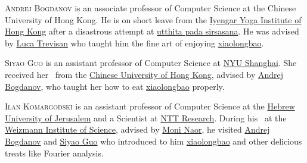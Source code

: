 \documentclass{toc}
\begin{document}
%
%
%
%
%
%
%
%
%
%
%
%
%
%
\begin{tocaboutauthors}
\begin{tocabout}[Bogdanov]  %
  \textsc{Andrej Bogdanov} is an associate professor of Computer Science at the Chinese University of Hong Kong. He is on short leave from the \href{http://www.iyengaryogahongkong.com}{Iyengar Yoga Institute of Hong Kong} after a disastrous attempt at \href{https://www.yogapedia.com/definition/8043/utthita-pada-sirsasana}{utthita pada sirsasana}.  He was advised by \href{https://lucatrevisan.wordpress.com}{Luca Trevisan} who taught him the fine art of enjoying \href{https://en.wikipedia.org/wiki/Xiaolongbao}{xiaolongbao}.
\end{tocabout}
\begin{tocabout}[Guo]
%
  \textsc{Siyao Guo} is an assistant professor of Computer Science at \href{https://shanghai.nyu.edu/}{NYU Shanghai}. She received her \phd\
from the \href{http://www.cuhk.edu.hk/english/index.html}{Chinese University of Hong Kong}, advised by 
\href{http://www.cse.cuhk.edu.hk/~andrejb/}{Andrej Bogdanov}, who taught her how to eat \href{https://en.wikipedia.org/wiki/Xiaolongbao}{xiaolongbao} properly.
\end{tocabout}
\begin{tocabout}[Komargodski]
  \textsc{Ilan Komargodski} is an assistant professor of Computer Science at the
  \href{https://www.cs.huji.ac.il/}{Hebrew University of Jerusalem} and a Scientist at \href{https://ntt-research.com/cis/}{NTT Research}. During his \phd\
at the \href{http://www.weizmann.ac.il/pages/}{Weizmann Institute of Science}, advised by
  \href{http://www.wisdom.weizmann.ac.il/~naor/}{Moni Naor}, he visited  \href{http://www.cse.cuhk.edu.hk/~andrejb/}{Andrej Bogdanov} and \href{https://sites.google.com/site/siyaoguo/}{Siyao Guo} who introduced to him  \href{https://en.wikipedia.org/wiki/Xiaolongbao}{xiaolongbao} and other delicious treats like Fourier analysis. 

%
%
%
%
%
%
%
%
%
%
%
%
%
%
%
%
%
%
\end{tocabout}
\end{tocaboutauthors}
\end{document}
